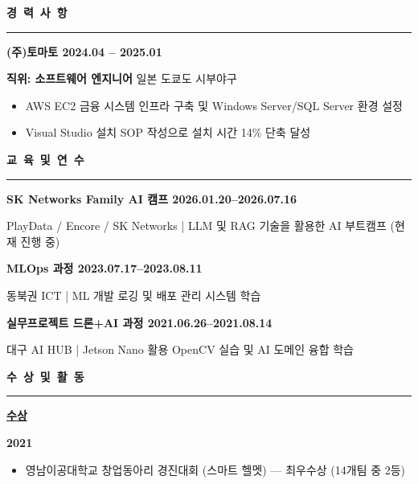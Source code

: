 \documentclass[a4paper, 10pt]{article}
\newcommand{\resumesection}[1]{%
  \vspace{8pt}
  \noindent
  {\large\bfseries #1}
  \vspace{2pt}
  \noindent\hrule
  \vspace{4pt}
}
\begin{document}
\resumesection{경\ 력\ 사\ 항}

\vspace{2pt}
\noindent
\textbf{(주)토마토 \hfill 2024.04 -- 2025.01}

\noindent
\textbf{\quad 직위: 소프트웨어 엔지니어} \hfill 일본 도쿄도 시부야구

\begin{itemize}
  \setlength{\itemsep}{1pt}
  \setlength{\parskip}{0pt}
  \item AWS EC2 금융 시스템 인프라 구축 및 Windows Server/SQL Server 환경 설정
  \item Visual Studio 설치 SOP 작성으로 설치 시간 14\% 단축 달성
\end{itemize}


\resumesection{교\ 육\ 및\ 연\ 수}

\vspace{2pt}
\noindent
\textbf{SK Networks Family AI 캠프 \hfill 2026.01.20--2026.07.16}

\noindent
{\small PlayData / Encore / SK Networks | LLM 및 RAG 기술을 활용한 AI 부트캠프 (현재 진행 중)}

\vspace{3pt}
\noindent
\textbf{MLOps 과정 \hfill 2023.07.17--2023.08.11}

\noindent
{\small 동북권 ICT | ML 개발 로깅 및 배포 관리 시스템 학습}

\vspace{3pt}
\noindent
\textbf{실무프로젝트 드론+AI 과정 \hfill 2021.06.26--2021.08.14}

\noindent
{\small 대구 AI HUB | Jetson Nano 활용 OpenCV 실습 및 AI 도메인 융합 학습}


\resumesection{수\ 상\ 및\ 활\ 동}

\vspace{2pt}
\noindent
\textbf{\underline{수상}}

\vspace{2pt}
\noindent
\textbf{2021}

\begin{itemize}
  \setlength{\itemsep}{1pt}
  \setlength{\parskip}{0pt}
  \item 영남이공대학교 창업동아리 경진대회 (스마트 헬멧) — 최우수상 (14개팀 중 2등)
\end{itemize}
\end{document}
